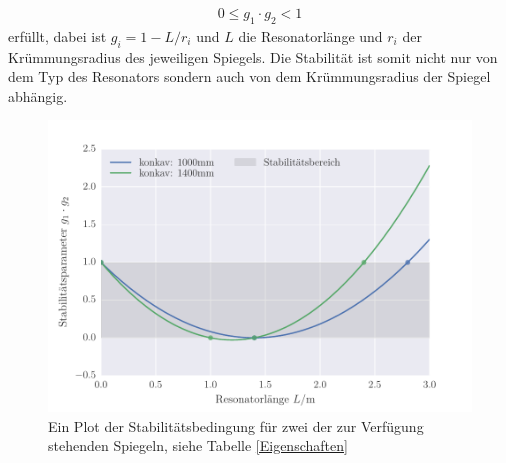 \begin{align}
0\le g_1\cdot g_2 < 1
\end{align}
erfüllt, dabei ist $g_i=1-L/r_i$ und $L$ die Resonatorlänge und $r_i$ der Krümmungsradius des jeweiligen Spiegels. Die Stabilität ist somit nicht nur von dem Typ des Resonators sondern auch von dem Krümmungsradius der Spiegel abhängig.
\begin{figure}
\centering
\includegraphics[scale=0.75]{../Grafiken/Stabilitaetsparameter.pdf}
\caption{Ein Plot der Stabilitätsbedingung für zwei der zur Verfügung stehenden Spiegeln, siehe Tabelle \ref{Eigenschaften}}
\label{fig:Stabilitaet}
\end{figure}
